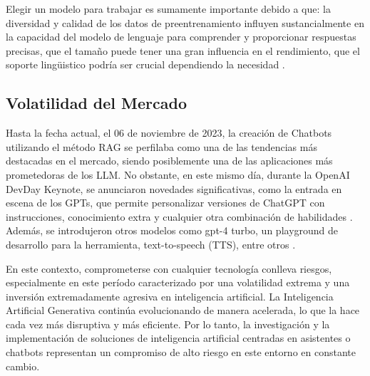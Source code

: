 Elegir un modelo para trabajar es sumamente importante debido a que: la diversidad y calidad de los datos de preentrenamiento influyen 
sustancialmente en la capacidad del modelo de lenguaje para comprender y proporcionar respuestas precisas, que el tamaño puede tener una 
gran influencia en el rendimiento, que el soporte lingüistico podría ser crucial dependiendo la necesidad \cite{modelos1}.



















\subsection{Volatilidad del Mercado}

Hasta la fecha actual, el 06 de noviembre de 2023, la creación de Chatbots utilizando el método RAG se perfilaba como 
una de las tendencias más destacadas en el mercado, siendo posiblemente una de las aplicaciones más prometedoras de los LLM. 
No obstante, en este mismo día, durante la OpenAI DevDay Keynote, se anunciaron novedades significativas, como la entrada en 
escena de los GPTs, que permite personalizar versiones de ChatGPT con instrucciones, conocimiento extra y cualquier otra combinación 
de habilidades \cite{openai2}. Además, se introdujeron otros modelos como gpt-4 turbo, un playground de desarrollo para la herramienta, 
text-to-speech (TTS), entre otros \cite{openai3}.

En este contexto, comprometerse con cualquier tecnología conlleva riesgos, especialmente en este período caracterizado por una 
volatilidad extrema y una inversión extremadamente agresiva en inteligencia artificial. La Inteligencia Artificial Generativa 
continúa evolucionando de manera acelerada, lo que la hace cada vez más disruptiva y más eficiente. Por lo tanto, la investigación 
y la implementación de soluciones de inteligencia artificial centradas en asistentes o chatbots representan un compromiso de alto 
riesgo en este entorno en constante cambio.

